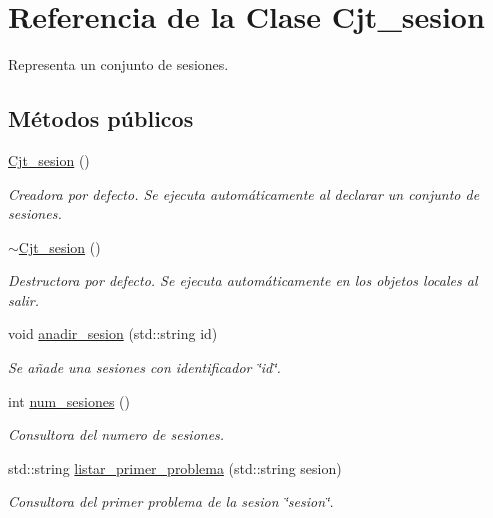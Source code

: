 \hypertarget{class_cjt__sesion}{}\section{Referencia de la Clase Cjt\+\_\+sesion}
\label{class_cjt__sesion}


Representa un conjunto de sesiones.  


\subsection*{Métodos públicos}
\begin{DoxyCompactItemize}
\item 
\mbox{\hyperlink{class_cjt__sesion_a706661671b7bc84b6537f4b074938551}{Cjt\+\_\+sesion}} ()
\begin{DoxyCompactList}\small\item\em Creadora por defecto. Se ejecuta automáticamente al declarar un conjunto de sesiones. \end{DoxyCompactList}\item 
\mbox{\hyperlink{class_cjt__sesion_aa6e81cd2268224ee70b0bc22df14ed5e}{$\sim$\+Cjt\+\_\+sesion}} ()
\begin{DoxyCompactList}\small\item\em Destructora por defecto. Se ejecuta automáticamente en los objetos locales al salir. \end{DoxyCompactList}\item 
void \mbox{\hyperlink{class_cjt__sesion_ace504b799e2c370749ccb16f9312fa5f}{anadir\+\_\+sesion}} (std\+::string id)
\begin{DoxyCompactList}\small\item\em Se añade una sesiones con identificador \char`\"{}id\char`\"{}. \end{DoxyCompactList}\item 
int \mbox{\hyperlink{class_cjt__sesion_aa885f9672e699d82dcd22aaa26d1ada8}{num\+\_\+sesiones}} ()
\begin{DoxyCompactList}\small\item\em Consultora del numero de sesiones. \end{DoxyCompactList}\item 
std\+::string \mbox{\hyperlink{class_cjt__sesion_aade2be6a90f0135b38342f877cc26ae6}{listar\+\_\+primer\+\_\+problema}} (std\+::string sesion)
\begin{DoxyCompactList}\small\item\em Consultora del primer problema de la sesion \char`\"{}sesion\char`\"{}. \end{DoxyCompactList}\item 

\end{DoxyCompactItemize}
